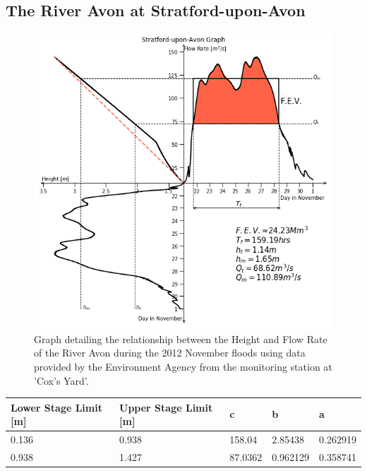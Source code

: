 \documentclass[11 pt, a4paper]{article}
\begin{document}
\subsection{The River Avon at Stratford-upon-Avon}
\begin{figure}[H]
\begin{center}
\includegraphics[width=.5\linewidth]{Stratford-Quadrant_Graph.png}
\caption{Graph detailing the relationship between the Height and Flow Rate of the River Avon during the 2012 November floods using data provided by the Environment Agency from the monitoring station at 'Cox's Yard'.}
\end{center}
\end{figure}
\begin{center}
\begin{tabular}{|l|l|l|l|l|}
\hline
Lower Stage Limit {[}m{]} & Upper Stage Limit {[}m{]} & c & b & a \\
\hline
0.136 & 0.938 & 158.04 & 2.85438 & 0.262919 \\
0.938 & 1.427 & 87.0362 & 0.962129 & 0.358741 \\
\hline
\end{tabular}
\end{center}
\end{document}
